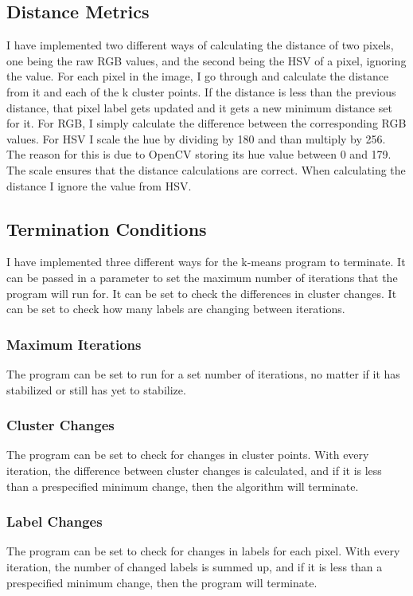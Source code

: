 \documentclass{article}
\begin{document}
\subsection{Distance Metrics}
I have implemented two different ways of calculating the distance of two pixels,
one being the raw RGB values, and the second being the HSV of a pixel, ignoring
the value. For each pixel in the image, I go through and calculate the distance
from it and each of the k cluster points. If the distance is less than the
previous distance, that pixel label gets updated and it gets a new minimum
distance set for it. For RGB, I simply calculate the difference between the
corresponding RGB values. For HSV I scale the hue by dividing by 180 and than
multiply by 256. The reason for this is due to OpenCV storing its hue value
between 0 and 179. The scale ensures that the distance calculations are
correct. When calculating the distance I ignore the value from HSV.

\subsection{Termination Conditions}
I have implemented three different ways for the k-means program to terminate.
It can be passed in a parameter to set the maximum number of iterations that the
program will run for. It can be set to check the differences in cluster
changes. It can be set to check how many labels are changing between iterations.

\subsubsection{Maximum Iterations}
The program can be set to run for a set number of iterations, no matter if it
has stabilized or still has yet to stabilize.

\subsubsection{Cluster Changes}
The program can be set to check for changes in cluster points. With every
iteration, the difference between cluster changes is calculated, and if it is
less than a prespecified minimum change, then the algorithm will terminate.

\subsubsection{Label Changes}
The program can be set to check for changes in labels for each pixel. With every
iteration, the number of changed labels is summed up, and if it is less than a
prespecified minimum change, then the program will terminate.
\end{document}
